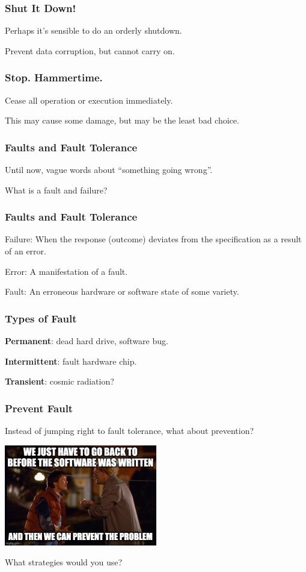 \begin{frame}
\frametitle{Shut It Down!}

Perhaps it's sensible to do an orderly shutdown.

Prevent data corruption, but cannot carry on.

\end{frame}

\begin{frame}
\frametitle{Stop. Hammertime.}

Cease all operation or execution immediately.

This may cause some damage, but may be the least bad choice.

\end{frame}

\begin{frame}
\frametitle{Faults and Fault Tolerance}

Until now, vague words about ``something going wrong''.

What is a fault and failure?

\end{frame}

\begin{frame}
\frametitle{Faults and Fault Tolerance}

\alert{Failure}: When the response (outcome) deviates from the specification as a result of an error.

\alert{Error}: A manifestation of a fault.

\alert{Fault}: An erroneous hardware or software state of some variety.

\end{frame}

\begin{frame}
\frametitle{Types of Fault}

\textbf{Permanent}: dead hard drive, software bug.

\textbf{Intermittent}: fault hardware chip.

\textbf{Transient}: cosmic radiation?

\end{frame}

\begin{frame}
\frametitle{Prevent Fault}

Instead of jumping right to fault tolerance, what about prevention?

\begin{center}
	\includegraphics[width=0.5\textwidth]{images/bttf.jpg}
\end{center}

What strategies would you use?

\end{frame}


